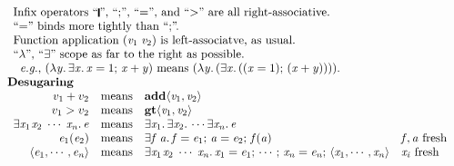{\begin{figure}[t]
$$\begin{array}{l}
\begin{array}[t]{l}
          \text{Infix operators ``\ensuremath{\rule[-0.3mm]{0.5mm}{2.5mm}}'', ``;'', ``\ensuremath{\mathrel{=}}'', and ``>'' are all right-associative.} \\
          \text{``\ensuremath{\mathrel{=}}'' binds more tightly than ``;''.} \\
          \text{Function application \ensuremath{(\Varid{v}_{\mathrm{1}}\;\Varid{v}_{\mathrm{2}})} is left-associatve, as usual.} \\
          \text{``$\lambda$'', ``\ensuremath{\exists}'' scope as far to the right as possible.} \\
          \hspace{2mm} \text{{\eg}, \ensuremath{(\lambda\Varid{y}.\,\exists\Varid{x}.\,\Varid{x}\mathrel{=}\mathrm{1};\,\Varid{x}\mathbin{+}\Varid{y})} means \ensuremath{(\lambda\Varid{y}.\,(\exists\Varid{x}.\,((\Varid{x}\mathrel{=}\mathrm{1});\,(\Varid{x}\mathbin{+}\Varid{y}))))}.}
    \end{array} \\
\textbf{Desugaring} \\
    \begin{array}{rcll}
      v_1 + v_2 & \text{means} & \ensuremath{\textbf{add}\langle\Varid{v}_{\mathrm{1}},\Varid{v}_{\mathrm{2}}\rangle} & \\
      v_1 > v_2 & \text{means} & \ensuremath{\textbf{gt}\langle\Varid{v}_{\mathrm{1}},\Varid{v}_{\mathrm{2}}\rangle} & \\
      \ensuremath{\exists\Varid{x}_{\mathrm{1}}\hspace{0.3mm}\Varid{x}_{\mathrm{2}}\;\cdots\;\Varid{x}_{\Varid{n}}.\,\Varid{e}} & \text{means} & \ensuremath{\exists\Varid{x}_{\mathrm{1}}.\,\exists\Varid{x}_{\mathrm{2}}.\,\cdots \exists\Varid{x}_{\Varid{n}}.\,\Varid{e}} & \\
      \ensuremath{\Varid{e}_{\mathrm{1}}(\Varid{e}_{\mathrm{2}})} & \text{means} & \ensuremath{\exists\Varid{f}\;\Varid{a}.\,\Varid{f}=\Varid{e}_{\mathrm{1}};\,\Varid{a}=\Varid{e}_{\mathrm{2}};\,\Varid{f}(\Varid{a})}  & \ensuremath{\Varid{f},\Varid{a}}\ \text{fresh} \\
      \ensuremath{\langle{}\Varid{e}_{\mathrm{1}},\cdots,\Varid{e}_{\Varid{n}}\rangle} & \text{means} &
          \ensuremath{\exists\Varid{x}_{\mathrm{1}}\hspace{0.3mm}\Varid{x}_{\mathrm{2}}\;\cdots\;\Varid{x}_{\Varid{n}}.\,\Varid{x}_{\mathrm{1}}\mathrel{=}\Varid{e}_{\mathrm{1}};\,\cdots;\,\Varid{x}_{\Varid{n}}\mathrel{=}\Varid{e}_{\Varid{n}};\,\langle{}\Varid{x}_{\mathrm{1}},\cdots,\Varid{x}_{\Varid{n}}\rangle} & \text{\ensuremath{\Varid{x}_{\Varid{i}}} fresh} \\

\end{array}
\end{array}$$
\end{figure}}
